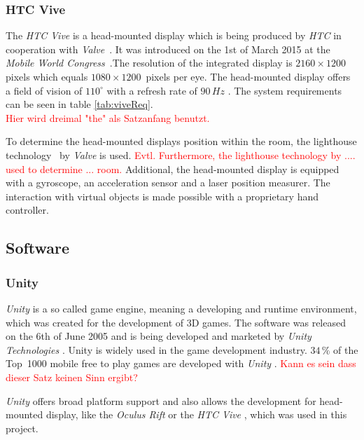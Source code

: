 \subsubsection{HTC Vive}\label{sec:Vive} 
The \textit{HTC Vive} is a head-mounted display which is being produced by \textit{HTC} in cooperation with \textit{Valve}~\cite{website:Valve}. It was introduced on the 1st of March 2015 at the \textit{Mobile World Congress}~\cite{website:mobileworldcongress}.The resolution of the integrated display is $2160\times1200$\,pixels which equals $1080\times1200$\, pixels per eye. The head-mounted display offers a field of vision of $110^\circ$ with a refresh rate of $90\,Hz$ \cite{website:HTC_Vive}.
The system requirements can be seen in table \ref{tab:viveReq}. \\ \textcolor{red}{Hier wird dreimal "the" als Satzanfang benutzt.}

To determine the head-mounted displays position within the room, the lighthouse technology~\cite{website:Lighthouses} by \textit{Valve} is used. \textcolor{red}{Evtl. Furthermore, the lighthouse technology by .... used to determine ... room.} Additional, the head-mounted display is equipped with a gyroscope, an acceleration sensor and a laser position measurer. The interaction with virtual objects is made possible with a proprietary hand controller. 
	
	\subsection{Software}
	
	\subsubsection{Unity}\label{sec:unity}
	\textit{Unity} is a so called game engine, meaning a developing and runtime environment, which was created for the development of 3D games. The software was released on the 6th of June 2005 \cite{haas2014histor} and is being developed and marketed by \textit{Unity Technologies} \cite{website:Unity}. Unity is widely used in the game development industry. $34\,\%$ of the Top~1000 mobile free to play games are developed with \textit{Unity} \cite{website:UnityPR}. \textcolor{red}{Kann es sein dass dieser Satz keinen Sinn ergibt?}
	
	\textit{Unity} offers broad platform support \cite{website:UnityMultiPlatform} and also allows the development for head-mounted display, like the \textit{Oculus Rift} \cite{website:UnityVRoverview} or the \textit{HTC Vive} \cite{website:UnityVRoverview}, which was used in this project.
	
